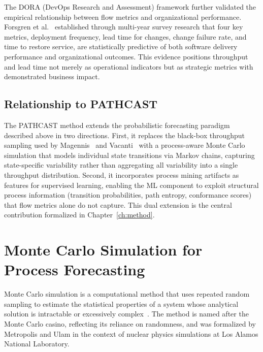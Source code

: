 The DORA (DevOps Research and Assessment) framework further validated
the empirical relationship between flow metrics and organizational
performance. Forsgren et al.~\cite{forsgren2018accelerate} established
through multi-year survey research that four key metrics, deployment
frequency, lead time for changes, change failure rate, and time to
restore service, are statistically predictive of both software delivery
performance and organizational outcomes. This evidence positions
throughput and lead time not merely as operational indicators but as
strategic metrics with demonstrated business impact.

\subsection{Relationship to PATHCAST}
\label{sec:flow-metrics-spaf}

The PATHCAST method extends the probabilistic forecasting
paradigm described above in two directions. First, it replaces the
black-box throughput sampling used by
Magennis~\cite{magennis2011forecasting} and
Vacanti~\cite{vacanti2020when} with a process-aware Monte Carlo
simulation that models individual state transitions via Markov chains,
capturing state-specific variability rather than aggregating all
variability into a single throughput distribution. Second, it
incorporates process mining artifacts as features for supervised
learning, enabling the ML component to exploit structural process
information (transition probabilities, path entropy, conformance
scores) that flow metrics alone do not capture. This dual extension is
the central contribution formalized in
Chapter~\ref{ch:method}.

\section{Monte Carlo Simulation for Process Forecasting}
\label{sec:monte-carlo}

Monte Carlo simulation is a computational method that uses repeated random
sampling to estimate the statistical properties of a system whose
analytical solution is intractable or excessively
complex~\cite{metropolis1949monte, robert2004monte, rubinstein2016simulation}.
The method is named after the Monte Carlo casino, reflecting its reliance
on randomness, and was formalized by Metropolis and Ulam in the context
of nuclear physics simulations at Los Alamos National Laboratory.

